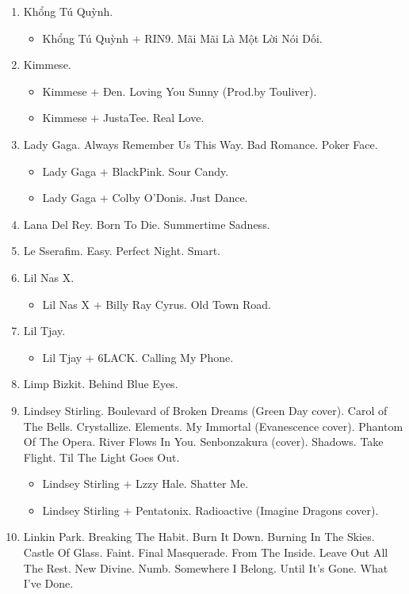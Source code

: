 \documentclass{article}
\begin{document}
\begin{enumerate}
\begin{itemize}
	\end{itemize}
	\item {\sc Khổng Tú Quỳnh.}
	\begin{itemize}
		\item {\sc Khổng Tú Quỳnh $+$ RIN9.} Mãi Mãi Là Một Lời Nói Dối.
	\end{itemize}
	\item {\sc Kimmese.}
	\begin{itemize}
		\item {\sc Kimmese $+$ Đen.} Loving You Sunny (Prod.by Touliver).
		\item {\sc Kimmese $+$ JustaTee.} Real Love.
	\end{itemize}
	\item {\sc Lady Gaga.} Always Remember Us This Way. Bad Romance. Poker Face.
	\begin{itemize}
		\item {\sc Lady Gaga $+$ BlackPink.} Sour Candy.
		\item {\sc Lady Gaga $+$ Colby O'Donis.} Just Dance.
	\end{itemize}
	\item {\sc Lana Del Rey.} Born To Die. Summertime Sadness.
	\item {\sc Le Sserafim.} Easy. Perfect Night. Smart.
	\item {\sc Lil Nas X.}
	\begin{itemize}
		\item {\sc Lil Nas X $+$ Billy Ray Cyrus.} Old Town Road.
	\end{itemize}
	\item {\sc Lil Tjay.}
	\begin{itemize}
		\item {\sc Lil Tjay $+$ 6LACK.} Calling My Phone.
	\end{itemize}
	\item {\sc Limp Bizkit.} Behind Blue Eyes.
	\item {\sc Lindsey Stirling.} Boulevard of Broken Dreams (Green Day cover). Carol of The Bells. Crystallize. Elements. My Immortal (Evanescence cover). Phantom Of The Opera. River Flows In You. Senbonzakura (cover). Shadows. Take Flight. Til The Light Goes Out.
	\begin{itemize}
		\item {\sc Lindsey Stirling $+$ Lzzy Hale.} Shatter Me.
		\item {\sc Lindsey Stirling $+$ Pentatonix.} Radioactive (Imagine Dragons cover).
	\end{itemize}
	\item {\sc Linkin Park.} Breaking The Habit. Burn It Down. Burning In The Skies. Castle Of Glass. Faint. Final Masquerade. From The Inside. Leave Out All The Rest. New Divine. Numb. Somewhere I Belong. Until It's Gone. What I've Done.

\end{enumerate}
\end{document}
